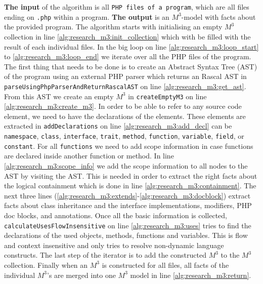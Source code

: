 \documentclass[../main.tex]{subfiles}
\begin{document}
	\textbf{The input} of the algorithm is all \texttt{PHP files of a program}, which are all files ending on \texttt{.php} within a program.
    \textbf{The output} is an $M^3$-model with facts about the provided program.
    The algorithm starts with initialising an empty $M^3$ collection in line \ref{alg:research_m3:init_collection} which with be filled with the result of each individual files.
    In the big loop on line \ref{alg:research_m3:loop_start} to \ref{alg:research_m3:loop_end} we iterate over all the PHP files of the program.
    The first thing that needs to be done is to create an Abstract Syntax Tree (\gls{AST}) of the program using an external PHP parser\footnotemark{} which returns an Rascal AST in \texttt{parseUsingPhpParserAndReturnRascalAST} on line \ref{alg:research_m3:get_ast}.
    From this AST we create an empty $M^3$ in \texttt{createEmptyM3} on line \ref{alg:research_m3:create_m3}.
    In order to be able to refer to any source code element, we need to have the declarations of the elements.
    These elements are extracted in \texttt{addDeclarations} on line \ref{alg:research_m3:add_decl} can be \texttt{namespace}, \texttt{class}, \texttt{interface}, \texttt{trait}, \texttt{method},  \texttt{function}, \texttt{variable}, \texttt{field}, or \texttt{constant}.
    For all \texttt{functions} we need to add scope information in case functions are declared inside another function or method.
    In line \ref{alg:research_m3:scope_info} we add the scope information to all nodes to the AST by visiting the AST.
    This is needed in order to extract the right facts about the logical containment which is done in line \ref{alg:research_m3:containment}.
    The next three lines (\ref{alg:research_m3:extends}-\ref{alg:research_m3:docblock}) extract facts about class inheritance and the interface implementations, modifiers, PHP doc blocks, and annotations.
   	Once all the basic information is collected, \texttt{calculateUsesFlowInsensitive} on line \ref{alg:research_m3:uses} tries to find the declarations of the used objects, methods, functions and variables.
   	This is flow and context insensitive and only tries to resolve non-dynamic language constructs.
   	The last step of the iterator is to add the constructed $M^3$ to the $M^3$ collection.
   	Finally when an $M^3$ is constructed for all files, all facts of the individual $M^3$'s are merged into one $M^3$ model in line \ref{alg:research_m3:return}. 
\end{document}
